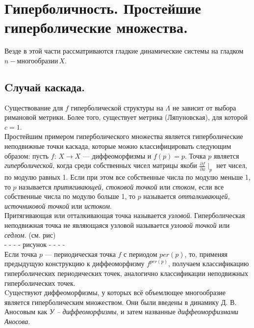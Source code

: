 \chapter{Гиперболичность. Простейшие гиперболические множества.}

Везде в этой части рассматриваются гладкие динамические системы на гладком \(n - \text{многообразии}\, X\). 

\section{Cлучай каскада.}


\noindent Cуществование для \(f\) гиперболической структуры на \(\Lambda\)
не зависит от выбора римановой метрики. Более того, существует метрика (Ляпуновская), для которой \(c = 1\). 
\\[2mm]
Простейшим примером гиперболического множества является гиперболические неподвижные точки каскада, которые можно классифицировать
следующим образом: пусть \(f{:}\, X \to X\) --- диффеоморфизмы и \(f(p) = p\). 
Точка \(p\) является \textit{гиперболической}, когда среди собственных чисел матрицы якоби \(\frac{\partial f}{\partial x} \mid_p\) нет чисел,
по модулю равных 1. Если при этом все собственные числа по модулю меньше 1, то \(p\) называется \textit{притягивающей, стоковой точкой} или \textit{стоком},
если все собственные числа по модулю больше 1, то \(p\) называется \textit{отталкивающей, источниковой точкой} или \textit{истоком}. 
\\[2mm]
Притягивающая или отталкивающая точка называется \textit{узловой}. Гиперболическая неподвижная точка
не являющаяся узловой называется \textit{узловой точкой} или \textit{седлом}. (см. рис) \\
- - - - рисунок - - - -\\
Если точка \(p\) --- периодическая точка \(f\) с периодом \(per(p)\), то, применяя предыдущую конструкцию к диффеоморфизму \(f^{per(p)}\),
получаем классификацию гиперболических периодических точек, аналогично классификации неподвижных гиперболических точек. 
\\[2mm]
Cуществуют диффеоморфизмы, у которых всё объемлющее многообразие является гиперболическим множеством. Они были введены в динамику Д. В. Аносовым как \textit{У -- диффеоморфизмы}, 
и затем названные \textit{диффеоморфизмами Аносова}. 

